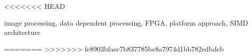 \documentclass[12pt,a4paper]{IEEEtran}
\begin{document}
  \maketitle

<<<<<<< HEAD
  
\begin{keywords}
 image processing, data dependent processing, 
FPGA, platform approach, SIMD architecture
\end{keywords}

=======
%  
>>>>>>> fe8903bfaec7b837785be8a7974d1bb782edbdeb
  
  
  
  
%  
 



\nocite{schoeberlleros}
\nocite{gaisler2002portable}

\nocite{hennessy1984vlsi}
\nocite{ip2006processor}
\nocite{robinson2010supersmall}
\nocite{niosII}
\nocite{picoblaze}

  
  
\end{document}
